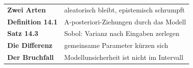 \begin{merksatz}
\begin{center}
\renewcommand{\arraystretch}{1.5}
\begin{tabular}{@{}P{3.0cm}P{5.6cm}@{}}
\toprule
\textbf{Zwei Arten} & aleatorisch bleibt, epistemisch schrumpft\\
\textbf{Definition 14.1} & A-posteriori-Ziehungen durch das Modell\\
\textbf{Satz 14.3} & Sobol: Varianz nach Eingaben zerlegen\\
\textbf{Die Differenz} & gemeinsame Parameter kürzen sich\\
\textbf{Der Bruchfall} & Modellunsicherheit ist nicht im Intervall\\
\bottomrule
\end{tabular}
\end{center}

\begin{center}
\begin{minipage}{0.88\textwidth}
\end{minipage}
\end{center}
\end{merksatz}
